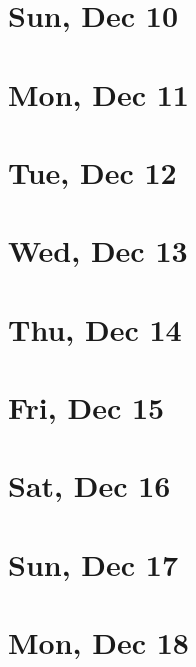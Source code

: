 	\section{Sun, Dec 10}
		
		
	\section{Mon, Dec 11}
		
		
	\section{Tue, Dec 12}
		
		
	\section{Wed, Dec 13}
		
		
	\section{Thu, Dec 14}
		
		
	\section{Fri, Dec 15}
		
		
	\section{Sat, Dec 16}
		
		
	\section{Sun, Dec 17}
		
		
	\section{Mon, Dec 18}
		
		
